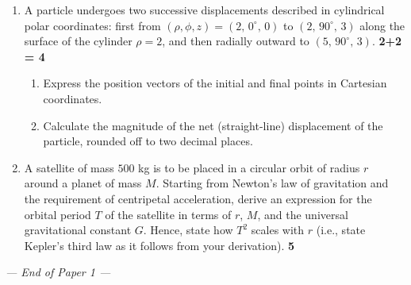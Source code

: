 \documentclass[11pt]{article}
\begin{document}
\begin{enumerate}[leftmargin=1.6em, label=\arabic*., itemsep=14pt]
\item A particle undergoes two successive displacements described in cylindrical polar coordinates: first from $(\rho,\phi,z) = (2,\,0^\circ,\,0)$ to $(2,\,90^\circ,\,3)$ along the surface of the cylinder $\rho = 2$, and then radially outward to $(5,\,90^\circ,\,3)$. \hfill \textbf{2+2 = 4}
\begin{enumerate}[label=(\roman*)]
  \item Express the position vectors of the initial and final points in Cartesian coordinates.
  \item Calculate the magnitude of the net (straight-line) displacement of the particle, rounded off to two decimal places.
\end{enumerate}

\item A satellite of mass $500$ kg is to be placed in a circular orbit of radius $r$ around a planet of mass $M$. Starting from Newton's law of gravitation and the requirement of centripetal acceleration, derive an expression for the orbital period $T$ of the satellite in terms of $r$, $M$, and the universal gravitational constant $G$. Hence, state how $T^2$ scales with $r$ (i.e., state Kepler's third law as it follows from your derivation). \hfill \textbf{5}

\end{enumerate}

\vspace{10pt}
\begin{center}
\textit{--- End of Paper 1 ---}
\end{center}
\end{document}
